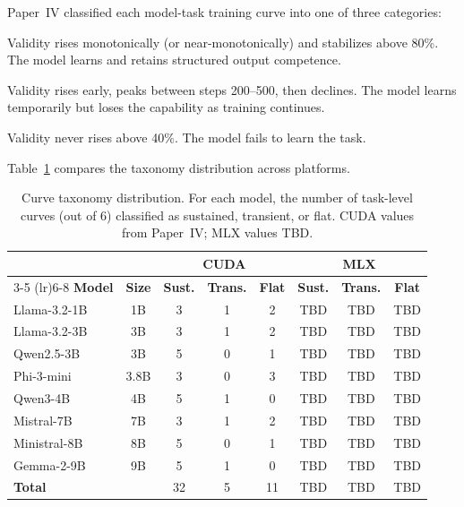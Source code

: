 \documentclass[11pt]{article}
\begin{document}
Paper~IV classified each model-task training curve into one of three categories:

\begin{description}[leftmargin=*]
\item[Sustained:] Validity rises monotonically (or near-monotonically) and stabilizes above 80\%.  The model learns and retains structured output competence.
\item[Transient:] Validity rises early, peaks between steps 200--500, then declines.  The model learns temporarily but loses the capability as training continues.
\item[Flat:] Validity never rises above 40\%.  The model fails to learn the task.
\end{description}

Table~\ref{tab:curve-taxonomy} compares the taxonomy distribution across platforms.

\begin{table}[t]
\centering
\caption{Curve taxonomy distribution.  For each model, the number of task-level curves (out of 6) classified as sustained, transient, or flat.  CUDA values from Paper~IV; MLX values TBD.}
\label{tab:curve-taxonomy}
\small
\begin{tabular}{lc ccc ccc}
\toprule
& & \multicolumn{3}{c}{\textbf{CUDA}} & \multicolumn{3}{c}{\textbf{MLX}} \\
\cmidrule(lr){3-5} \cmidrule(lr){6-8}
\textbf{Model} & \textbf{Size} & \textbf{Sust.} & \textbf{Trans.} & \textbf{Flat} & \textbf{Sust.} & \textbf{Trans.} & \textbf{Flat} \\
\midrule
Llama-3.2-1B & 1B & 3 & 1 & 2 & TBD & TBD & TBD \\
Llama-3.2-3B & 3B & 3 & 1 & 2 & TBD & TBD & TBD \\
Qwen2.5-3B & 3B & 5 & 0 & 1 & TBD & TBD & TBD \\
Phi-3-mini & 3.8B & 3 & 0 & 3 & TBD & TBD & TBD \\
Qwen3-4B & 4B & 5 & 1 & 0 & TBD & TBD & TBD \\
Mistral-7B & 7B & 3 & 1 & 2 & TBD & TBD & TBD \\
Ministral-8B & 8B & 5 & 0 & 1 & TBD & TBD & TBD \\
Gemma-2-9B & 9B & 5 & 1 & 0 & TBD & TBD & TBD \\
\midrule
\textbf{Total} & & 32 & 5 & 11 & TBD & TBD & TBD \\
\bottomrule
\end{tabular}
\end{table}
\end{document}
